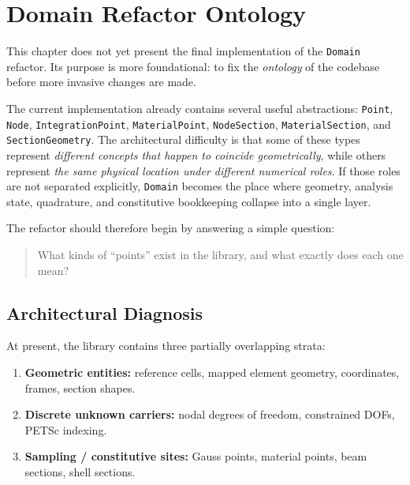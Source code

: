 
\chapter{Domain Refactor Ontology}
\label{ch:domain-ontology}

This chapter does not yet present the final implementation of the
\texttt{Domain} refactor.  Its purpose is more foundational: to fix the
\emph{ontology} of the codebase before more invasive changes are made.

The current implementation already contains several useful abstractions:
\texttt{Point}, \texttt{Node}, \texttt{IntegrationPoint},
\texttt{MaterialPoint}, \texttt{NodeSection}, \texttt{MaterialSection}, and
\texttt{SectionGeometry}.  The architectural difficulty is that some of these
types represent \emph{different concepts that happen to coincide
geometrically}, while others represent \emph{the same physical location under
different numerical roles}.  If those roles are not separated explicitly,
\texttt{Domain} becomes the place where geometry, analysis state, quadrature,
and constitutive bookkeeping collapse into a single layer.

The refactor should therefore begin by answering a simple question:

\begin{quote}
What kinds of ``points'' exist in the library, and what exactly does each one
mean?
\end{quote}


\section{Architectural Diagnosis}
\label{sec:domain-ontology-diagnosis}

At present, the library contains three partially overlapping strata:

\begin{enumerate}[nosep]
  \item \textbf{Geometric entities:} reference cells, mapped element geometry,
        coordinates, frames, section shapes.
  \item \textbf{Discrete unknown carriers:} nodal degrees of freedom,
        constrained DOFs, PETSc indexing.
  \item \textbf{Sampling / constitutive sites:} Gauss points, material points,
        beam sections, shell sections.
\end{enumerate}

